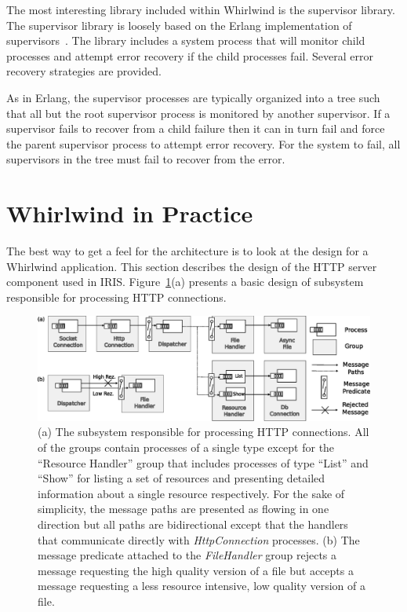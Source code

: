 \documentclass[conference,a4paper,final]{IEEEtran}
\begin{document}
The most interesting library included within Whirlwind is the supervisor library. The supervisor library is loosely based on the Erlang implementation of supervisors~\cite{Armstrong03Thesis}. The library includes a system process that will monitor child processes and attempt error recovery if the child processes fail. Several error recovery strategies are provided. 

As in Erlang, the supervisor processes are typically organized into a tree such that all but the root supervisor process is monitored by another supervisor. If a supervisor fails to recover from a child failure then it can in turn fail and force the parent supervisor process to attempt error recovery. For the system to fail, all supervisors in the tree must fail to recover from the error. 

\section{Whirlwind in Practice}

The best way to get a feel for the architecture is to look at the design for a Whirlwind application. This section describes the design of the HTTP server component used in IRIS. Figure~\ref{figure:http-server}(a) presents a basic design of subsystem responsible for processing HTTP connections.

\begin{figure}[htbp]
\centering
\includegraphics[width=\linewidth]{http-server.eps}
\caption{(a) The subsystem responsible for processing HTTP connections. All of the groups contain processes of a single type except for the ``Resource Handler'' group that includes processes of type ``List'' and ``Show'' for listing a set of resources and presenting detailed information about a single resource respectively. For the sake of simplicity, the message paths are presented as flowing in one direction but all paths are bidirectional except that the handlers that communicate directly with \emph{HttpConnection} processes. (b) The message predicate attached to the \emph{FileHandler} group rejects a message requesting the high quality version of a file but accepts a message requesting a less resource intensive, low quality version of a file.}
\label{figure:http-server}
\end{figure} 
\end{document}
